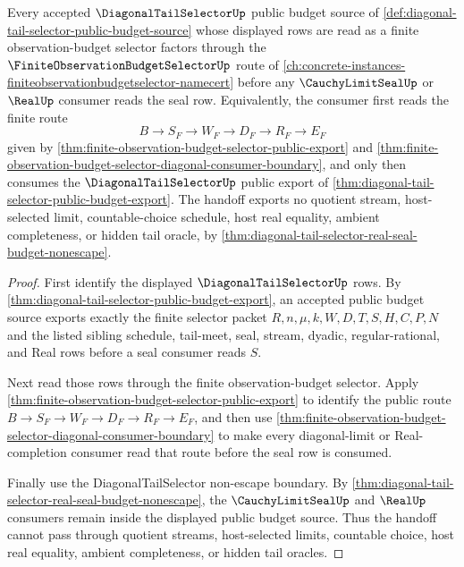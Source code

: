 \begin{theorem}
\label{thm:diagonal-tail-selector-finite-observation-budget-selector-link}
Every accepted $\DiagonalTailSelectorUp$ public budget source of
\autoref{def:diagonal-tail-selector-public-budget-source} whose displayed
rows are read as a finite observation-budget selector factors through the
$\FiniteObservationBudgetSelectorUp$ route of
\autoref{ch:concrete-instances-finiteobservationbudgetselector-namecert}
before any $\CauchyLimitSealUp$ or $\RealUp$ consumer reads the seal row.
Equivalently, the consumer first reads the finite route
$$
B \to S_F \to W_F \to D_F \to R_F \to E_F
$$
given by \autoref{thm:finite-observation-budget-selector-public-export} and
\autoref{thm:finite-observation-budget-selector-diagonal-consumer-boundary},
and only then consumes the $\DiagonalTailSelectorUp$ public export of
\autoref{thm:diagonal-tail-selector-public-budget-export}. The handoff
exports no quotient stream, host-selected limit, countable-choice schedule,
host real equality, ambient completeness, or hidden tail oracle, by
\autoref{thm:diagonal-tail-selector-real-seal-budget-nonescape}.
\end{theorem}
\begin{proof}
First identify the displayed $\DiagonalTailSelectorUp$ rows. By
\autoref{thm:diagonal-tail-selector-public-budget-export}, an accepted public
budget source exports exactly the finite selector packet
$R,n,\mu,k,W,D,T,S,H,C,P,N$ and the listed sibling schedule, tail-meet, seal,
stream, dyadic, regular-rational, and Real rows before a seal consumer reads
$S$.

Next read those rows through the finite observation-budget selector. Apply
\autoref{thm:finite-observation-budget-selector-public-export} to identify
the public route $B \to S_F \to W_F \to D_F \to R_F \to E_F$, and then use
\autoref{thm:finite-observation-budget-selector-diagonal-consumer-boundary}
to make every diagonal-limit or Real-completion consumer read that route
before the seal row is consumed.

Finally use the DiagonalTailSelector non-escape boundary. By
\autoref{thm:diagonal-tail-selector-real-seal-budget-nonescape}, the
$\CauchyLimitSealUp$ and $\RealUp$ consumers remain inside the displayed
public budget source. Thus the handoff cannot pass through quotient streams,
host-selected limits, countable choice, host real equality, ambient
completeness, or hidden tail oracles.
\end{proof}

